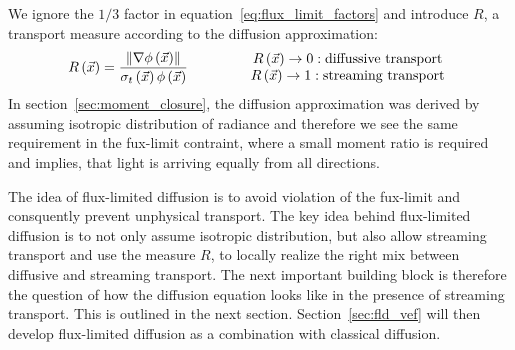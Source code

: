 We ignore the $1/3$ factor in equation~\ref{eq:flux_limit_factors} and introduce $R$, a transport measure according to the diffusion approximation:
\begin{align}
R\left(\vec{x}\right)
= 
\frac{\left\lVert\nabla\phi\left(\vec{x}\right)\right\rVert}{\sigma_t\left(\vec{x}\right)\phi\left(\vec{x}\right)}
\qquad
\qquad
\begin{array}{cc}
R\left(\vec{x}\right)\rightarrow 0 : \text{diffussive transport}\\
R\left(\vec{x}\right)\rightarrow 1 : \text{streaming transport}
\end{array}
\end{align}
In section~\ref{sec:moment_closure}, the diffusion approximation was derived by assuming isotropic distribution of radiance and therefore we see the same requirement in the fux-limit contraint, where a small moment ratio is required and implies, that light is arriving equally from all directions.

The idea of flux-limited diffusion is to avoid violation of the fux-limit and consquently prevent unphysical transport. The key idea behind flux-limited diffusion is to not only assume isotropic distribution, but also allow streaming transport and use the measure $R$, to locally realize the right mix between diffusive and streaming transport. The next important building block is therefore the question of how the diffusion equation looks like in the presence of streaming transport. This is outlined in the next section. Section~\ref{sec:fld_vef} will then develop flux-limited diffusion as a combination with classical diffusion.
